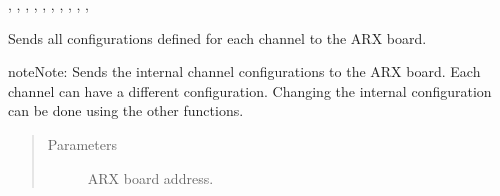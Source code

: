 \documentclass[letterpaper,10pt,english]{sphinxmanual}
\begin{document}
\begin{fulllineitems}
\begin{fulllineitems}
{\hyperref[\detokenize{index:lwautils.lwa_arx.ARX.set_all_different_chan_cfg}]{}}, {\hyperref[\detokenize{index:lwautils.lwa_arx.ARX.set_chan_cfg}]{}}, {\hyperref[\detokenize{index:lwautils.lwa_arx.ARX.set_chan_cfg_input_dc_pwr_off}]{}}, {\hyperref[\detokenize{index:lwautils.lwa_arx.ARX.set_chan_cfg_input_dc_pwr_on}]{}}, {\hyperref[\detokenize{index:lwautils.lwa_arx.ARX.set_chan_cfg_lowpass_narrow}]{}}, {\hyperref[\detokenize{index:lwautils.lwa_arx.ARX.set_chan_cfg_lowpass_wide}]{}}, {\hyperref[\detokenize{index:lwautils.lwa_arx.ARX.set_chan_cfg_highpass_narrow}]{}}, , {\hyperref[\detokenize{index:lwautils.lwa_arx.ARX.set_chan_cfg_first_atten}]{}}, {\hyperref[\detokenize{index:lwautils.lwa_arx.ARX.set_chan_cfg_second_atten}]{}}, {\hyperref[\detokenize{index:lwautils.lwa_arx.ARX.show_chan_cfg}]{}}



\end{fulllineitems}


\begin{fulllineitems}
\label{\detokenize{index:lwautils.lwa_arx.ARX.set_all_different_chan_cfg}}
Sends all configurations defined for each channel to the ARX board.

\begin{sphinxadmonition}{note}{Note:}
Sends the internal channel configurations to the ARX board.
Each channel can have a different configuration.
Changing the internal configuration can be done using the other
 functions.
\end{sphinxadmonition}
\begin{quote}\begin{description}
\item[{Parameters}] \leavevmode
{} \textendash{} ARX board address.


\end{description}
\end{quote}
\end{fulllineitems}
\end{fulllineitems}
\end{document}

